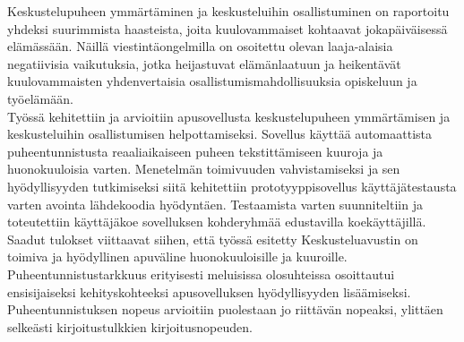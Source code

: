 \documentclass[english, 12pt, a4paper, pdftex, elec, utf8]{aaltothesis}
\begin{document}
\newpage

\begin{abstractpage}[finnish]
Keskustelupuheen ymmärtäminen ja keskusteluihin osallistuminen on raportoitu yhdeksi suurimmista haasteista, joita kuulovammaiset kohtaavat jokapäiväisessä elämässään. Näillä viestintäongelmilla on osoitettu olevan laaja-alaisia negatiivisia vaikutuksia, jotka heijastuvat elämänlaatuun ja heikentävät kuulovammaisten yhdenvertaisia osallistumismahdollisuuksia opiskeluun ja työelämään. \\

Työssä kehitettiin ja arvioitiin apusovellusta keskustelupuheen ymmärtämisen ja keskusteluihin osallistumisen helpottamiseksi. Sovellus käyttää automaattista puheentunnistusta reaaliaikaiseen puheen tekstittämiseen kuuroja ja huonokuuloisia varten. Menetelmän toimivuuden vahvistamiseksi ja sen hyödyllisyyden tutkimiseksi siitä kehitettiin prototyyppisovellus käyttäjätestausta varten avointa lähdekoodia hyödyntäen. Testaamista varten suunniteltiin ja toteutettiin käyttäjäkoe sovelluksen kohderyhmää edustavilla koekäyttäjillä. \\

Saadut tulokset viittaavat siihen, että työssä esitetty Keskusteluavustin on toimiva ja hyödyllinen apuväline huonokuuloisille ja kuuroille. Puheentunnistustarkkuus erityisesti meluisissa olosuhteissa osoittautui ensisijaiseksi kehityskohteeksi apusovelluksen hyödyllisyyden lisäämiseksi. Puheentunnistuksen nopeus arvioitiin puolestaan jo riittävän nopeaksi, ylittäen selkeästi kirjoitustulkkien kirjoitusnopeuden. 
\end{abstractpage}

\newpage

\end{document}
